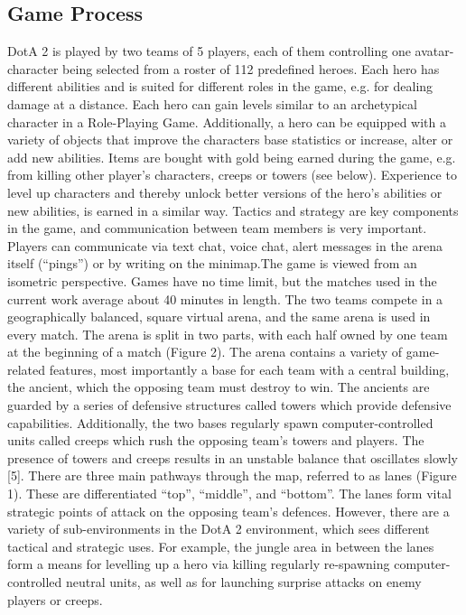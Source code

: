 \documentclass[letterpaper, 10 pt, conference]{ieeeconf}  %
\begin{document}
\subsection{Game Process}
DotA 2 is played by two teams of 5 players, each of them controlling one avatar-character being selected from a roster of 112 predefined heroes. Each hero has different abilities and is suited for different roles in the game, e.g. for dealing damage at a distance. Each hero can gain levels similar to an archetypical character in a Role-Playing Game. Additionally, a hero can be equipped with a variety of objects that improve the characters base statistics or increase, alter or add new abilities. Items are bought with gold being earned during the game, e.g. from killing other player’s characters, creeps or towers (see below). Experience to level up characters and thereby unlock better versions of the hero’s abilities or new abilities, is earned in a similar way. Tactics and strategy are key components in the game, and communication between team members is very important. Players can communicate via text chat, voice chat, alert messages in the arena itself (“pings”) or by writing on the minimap.The game is viewed from an isometric perspective. Games have no time limit, but the matches used in the current work average about 40 minutes in length. The two teams compete in a geographically balanced, square virtual arena, and the same arena is used in every match. The arena is split in two parts, with each half owned by one team at the beginning of a match (Figure 2). The arena contains a variety of game-related features, most importantly a base for each team with a central building, the ancient, which the opposing team must destroy to win. The ancients are guarded by a series of defensive structures called towers which provide defensive capabilities. Additionally, the two bases regularly spawn computer-controlled units called creeps which rush the opposing team’s towers and players. The presence of towers and creeps results in an unstable balance that oscillates slowly [5]. There are three main pathways through the map, referred to as lanes (Figure 1). These are differentiated “top”, “middle”, and “bottom”. The lanes form vital strategic points of attack on the opposing team’s defences. However, there are a variety of sub-environments in the DotA 2 environment, which sees different tactical and strategic uses. For example, the jungle area in between the lanes form a means for levelling up a hero via killing regularly re-spawning computer-controlled neutral units, as well as for launching surprise attacks on enemy players or creeps.
\end{document}

